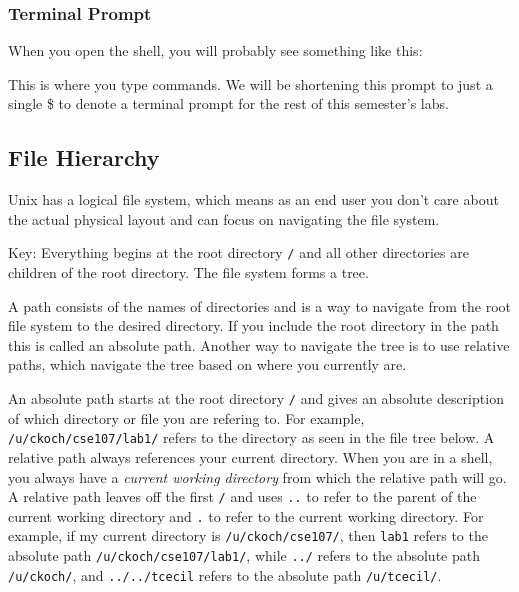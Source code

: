 \documentclass[11pt]{cselabheader}
\begin{document}
\subsubsection{Terminal Prompt}

When you open the shell, you will probably see something like this:


This is where you type commands. We will be shortening this prompt to just a
single \$ to denote a terminal prompt for the rest of this semester's labs.

\subsection{File Hierarchy}

Unix has a logical file system, which means as an end user you don't care about
the actual physical layout and can focus on navigating the file system.

Key: Everything begins at the root directory
\texttt{/} and all other directories are children of the root directory. The
file system forms a tree.

A path consists of the names of directories and is a way to navigate from the
root file system to the desired directory. If you include the root directory in
the path this is called an absolute path. Another way to navigate the tree is to
use relative paths, which navigate the tree based on where you currently are.

An absolute path starts at the root directory \texttt{/} and gives an absolute
description of which directory or file you are refering to. For example,
\texttt{/u/ckoch/cse107/lab1/} refers to the directory as seen in the file tree
below. A relative path always references your current directory. When you are in
a shell, you always have a \textit{current working directory} from which the
relative path will go. A relative path leaves off the first \texttt{/} and uses
\texttt{..} to refer to the parent of the current working directory and
\texttt{.} to refer to the current working directory. For example, if my current
directory is \texttt{/u/ckoch/cse107/}, then \texttt{lab1} refers to the absolute
path \texttt{/u/ckoch/cse107/lab1/}, while \texttt{../} refers to the absolute
path \texttt{/u/ckoch/}, and \texttt{../../tcecil} refers to the absolute path
\texttt{/u/tcecil/}.
\end{document}

